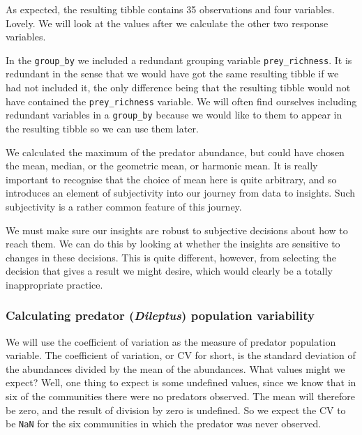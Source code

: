 \documentclass[]{book}
\makeatletter
\newenvironment{kframe}{%
\medskip{}
\setlength{\fboxsep}{.8em}
 \def\at@end@of@kframe{}%
 \ifinner\ifhmode%
  \def\at@end@of@kframe{\end{minipage}}%
  \begin{minipage}{\columnwidth}%
 \fi\fi%
 \def\FrameCommand##1{\hskip\@totalleftmargin \hskip-\fboxsep
 \colorbox{shadecolor}{##1}\hskip-\fboxsep
     \hskip-\linewidth \hskip-\@totalleftmargin \hskip\columnwidth}%
 \MakeFramed {\advance\hsize-\width
   \@totalleftmargin\z@ \linewidth\hsize
   \@setminipage}}%
 {\par\unskip\endMakeFramed%
 \at@end@of@kframe}
\newenvironment{rmdblock}[1]
  {
  \begin{itemize}
  \renewcommand{\labelitemi}{
    \raisebox{-.7\height}[0pt][0pt]{
      {\setkeys{Gin}{width=3em,keepaspectratio}\texttt{[image: images/\#1]}}
    }
  }
  \setlength{\fboxsep}{1em}
  \begin{kframe}
  \item
  }
  {
  \end{kframe}
  \end{itemize}
  }
\newenvironment{warning}
  {\begin{rmdblock}{warning}}
  {\end{rmdblock}}
\newenvironment{info}
  {\begin{rmdblock}{info}}
  {\end{rmdblock}}
\newenvironment{reliability}
  {\begin{rmdblock}{reliability}}
  {\end{rmdblock}}
\makeatother
\begin{document}
As expected, the resulting tibble contains 35 observations and four variables. Lovely. We will look at the values after we calculate the other two response variables.

\begin{info}
In the \texttt{group\_by} we included a redundant grouping variable
\texttt{prey\_richness}. It is redundant in the sense that we would have
got the same resulting tibble if we had not included it, the only
difference being that the resulting tibble would not have contained the
\texttt{prey\_richness} variable. We will often find ourselves including
redundant variables in a \texttt{group\_by} because we would like to
them to appear in the resulting tibble so we can use them later.
\end{info}

\begin{warning}
We calculated the maximum of the predator abundance, but could have
chosen the mean, median, or the geometric mean, or harmonic mean. It is
really important to recognise that the choice of mean here is quite
arbitrary, and so introduces an element of subjectivity into our journey
from data to insights. Such subjectivity is a rather common feature of
this journey.
\end{warning}

\begin{reliability}
We must make sure our insights are robust to subjective decisions about
how to reach them. We can do this by looking at whether the insights are
sensitive to changes in these decisions. This is quite different,
however, from selecting the decision that gives a result we might
desire, which would clearly be a totally inappropriate practice.
\end{reliability}

\hypertarget{calculating-predator-dileptus-population-variability}{%
\subsubsection{\texorpdfstring{Calculating predator (\emph{Dileptus}) population variability}{Calculating predator (Dileptus) population variability}}\label{calculating-predator-dileptus-population-variability}}

We will use the coefficient of variation as the measure of predator population variable. The coefficient of variation, or CV for short, is the standard deviation of the abundances divided by the mean of the abundances. What values might we expect? Well, one thing to expect is some undefined values, since we know that in six of the communities there were no predators observed. The mean will therefore be zero, and the result of division by zero is undefined. So we expect the CV to be \texttt{NaN} for the six communities in which the predator was never observed.
\end{document}

